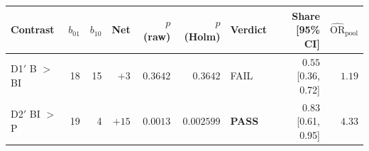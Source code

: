 \begin{tabular}{l r r r r r l r r}
\toprule
Contrast & $b_{01}$ & $b_{10}$ & Net & $p$ (raw) & $p$ (Holm) & Verdict & Share [95\% CI] & $\widehat{\mathrm{OR}}_{\mathrm{pool}}$ \\
\midrule
D1$'$ \quad B $>$ BI & 18 & 15 & $+3$ & $0.3642$ & $0.3642$ & FAIL & $0.55$ [0.36, 0.72] & $1.19$ \\
D2$'$ \quad BI $>$ P & 19 & 4 & $+15$ & $0.0013$ & $0.002599$ & \textbf{PASS} & $0.83$ [0.61, 0.95] & $4.33$ \\
\bottomrule
\end{tabular}
